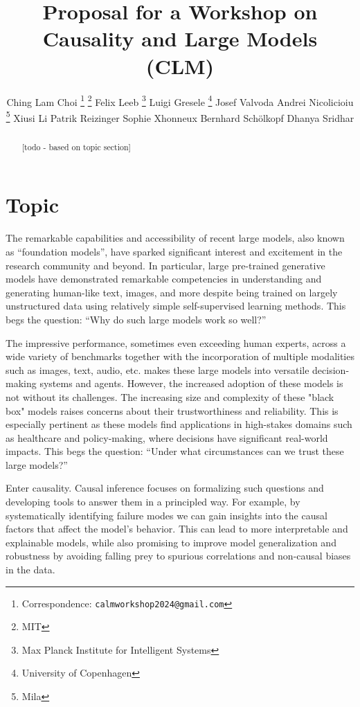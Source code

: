 \documentclass{article}
\title{Proposal for a Workshop on \\
Causality and Large Models (C\emoji{heart}LM)}
\author{%
    Ching Lam Choi \thanks{Correspondence: \texttt{calmworkshop2024@gmail.com}} \thanks{MIT}
    \And
    Felix Leeb \footnotemark[1] \thanks{Max Planck Institute for Intelligent Systems}
    \And
    Luigi Gresele \thanks{University of Copenhagen}
    \And
    Josef Valvoda \footnotemark[4]
    \And
    Andrei Nicolicioiu \thanks{Mila}
    \And
    Xiusi Li \footnotemark[5]
    \And
    Patrik Reizinger \footnotemark[3]
    \And
    Sophie Xhonneux \footnotemark[5]
    \And
    Bernhard Schölkopf \footnotemark[3]
    \And
    Dhanya Sridhar \footnotemark[5]
}
\begin{document}
\maketitle


\begin{abstract}
[todo - based on topic section]
\end{abstract}



\section{Topic}

The remarkable capabilities and accessibility of recent large models, also known as ``foundation models'', have sparked significant interest and excitement in the research community and beyond. In particular, large pre-trained generative models have demonstrated remarkable competencies in understanding and generating human-like text, images, and more despite being trained on largely unstructured data using relatively simple self-supervised learning methods. This begs the question: ``Why do such large models work so well?'' %

The impressive performance, sometimes even exceeding human experts, across a wide variety of benchmarks together with the incorporation of multiple modalities such as images, text, audio, etc. makes these large models into versatile decision-making systems and agents.
However, the increased adoption of these models is not without its challenges. The increasing size and complexity of these "black box" models raises concerns about their trustworthiness and reliability.
This is especially pertinent as these models find applications in high-stakes domains such as healthcare and policy-making, where decisions have significant real-world impacts.
This begs the question: ``Under what circumstances can we trust these large models?'' %

Enter causality. Causal inference focuses on formalizing such questions and developing tools to answer them in a principled way. For example, by systematically identifying failure modes 
we can gain insights into the causal factors that affect the model's behavior. 
This can lead to more interpretable and explainable models, while also promising to improve model generalization and robustness by avoiding falling prey to spurious correlations and non-causal biases in the data.
\end{document}
